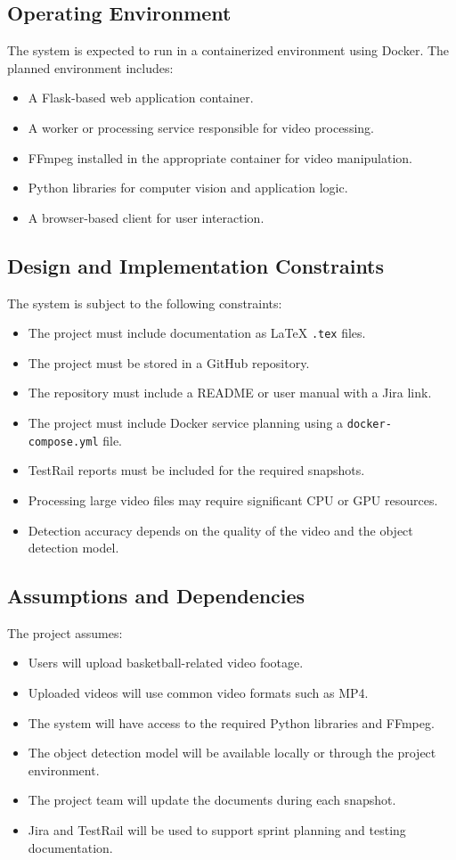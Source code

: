 \documentclass[12pt]{article}
\begin{document}
\subsection{Operating Environment}
The system is expected to run in a containerized environment using Docker. The planned environment includes:
\begin{itemize}[noitemsep]
    \item A Flask-based web application container.
    \item A worker or processing service responsible for video processing.
    \item FFmpeg installed in the appropriate container for video manipulation.
    \item Python libraries for computer vision and application logic.
    \item A browser-based client for user interaction.
\end{itemize}

\subsection{Design and Implementation Constraints}
The system is subject to the following constraints:
\begin{itemize}[noitemsep]
    \item The project must include documentation as LaTeX \texttt{.tex} files.
    \item The project must be stored in a GitHub repository.
    \item The repository must include a README or user manual with a Jira link.
    \item The project must include Docker service planning using a \texttt{docker-compose.yml} file.
    \item TestRail reports must be included for the required snapshots.
    \item Processing large video files may require significant CPU or GPU resources.
    \item Detection accuracy depends on the quality of the video and the object detection model.
\end{itemize}

\subsection{Assumptions and Dependencies}
The project assumes:
\begin{itemize}[noitemsep]
    \item Users will upload basketball-related video footage.
    \item Uploaded videos will use common video formats such as MP4.
    \item The system will have access to the required Python libraries and FFmpeg.
    \item The object detection model will be available locally or through the project environment.
    \item The project team will update the documents during each snapshot.
    \item Jira and TestRail will be used to support sprint planning and testing documentation.
\end{itemize}
\end{document}
